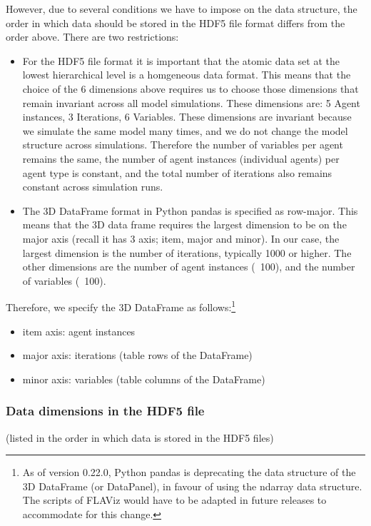 \documentclass[10pt,a4paper]{article}
\begin{document}
However, due to several conditions we have to impose on the data structure, the order in which data should be stored in the HDF5 file format differs from the order above.
There are two restrictions:

\begin{itemize}
\item[1.] For the HDF5 file format it is important that the atomic data set at the lowest hierarchical level is a homgeneous data format.
This means that the choice of the 6 dimensions above requires us to choose those dimensions that remain invariant across all model simulations.
These dimensions are: 5 Agent instances, 3 Iterations, 6 Variables. These dimensions are invariant because we simulate the same model many times, and we do not change the model structure across simulations.
Therefore the number of variables per agent remains the same, the number of agent instances (individual agents) per agent type is constant, and the total number of iterations also remains constant across simulation runs.

\item[2.] The 3D DataFrame format in Python pandas is specified as row-major. This means that the 3D data frame requires the largest dimension to be on the major axis (recall it has 3 axis; item, major and minor).
In our case, the largest dimension is the number of iterations, typically 1000 or higher. The other dimensions are the number of agent instances (~100), and the number of variables (~100).
\end{itemize}

Therefore, we specify the 3D DataFrame as follows:\footnote{As of version 0.22.0, Python pandas is deprecating the data structure of the 3D DataFrame (or DataPanel), in favour of using the ndarray data structure. The scripts of FLAViz would have to be adapted in future releases to accommodate for this change.}
\begin{itemize}
\item item axis: agent instances
\item major axis: iterations (table rows of the DataFrame)
\item minor axis: variables (table columns of the DataFrame)
\end{itemize}

\subsubsection{Data dimensions in the HDF5 file}
 (listed in the order in which data is stored in the HDF5 files)
\end{document}
